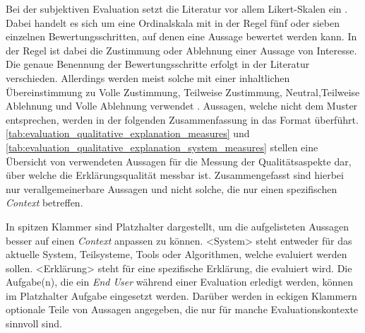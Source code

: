 \bigskip

Bei der subjektiven Evaluation setzt die Literatur vor allem Likert-Skalen ein \cite{sato_action-triggering_2019, sato_context_nodate, wang_is_2018}. Dabei handelt es sich um eine Ordinalskala mit in der Regel fünf oder sieben einzelnen Bewertungsschritten, auf denen eine Aussage bewertet werden kann. In der Regel ist dabei die Zustimmung oder Ablehnung einer Aussage von Interesse. Die genaue Benennung der Bewertungsschritte erfolgt in der Literatur verschieden. Allerdings werden meist solche mit einer inhaltlichen Übereinstimmung zu \glqq Volle Zustimmung\grqq{}, \glqq Teilweise Zustimmung\grqq{}, \glqq Neutral\grqq{},\glqq Teilweise Ablehnung\grqq{} und \glqq Volle Ablehnung\grqq{} verwendet \cite{hoffman_metrics_nodate, koo_understanding_2016, koo_why_2015, hernandez-bocanegra_effects_2020}. Aussagen, welche nicht dem Muster entsprechen, werden in der folgenden Zusammenfassung in das Format überführt. \autoref{tab:evaluation_qualitative_explanation_measures} und \autoref{tab:evaluation_qualitative_explanation_system_measures} stellen eine Übersicht von verwendeten Aussagen für die Messung der Qualitätsaspekte dar, über welche die Erklärungsqualität messbar ist. Zusammengefasst sind hierbei nur verallgemeinerbare Aussagen und nicht solche, die nur einen spezifischen \textit{Context} betreffen.

In spitzen Klammer sind Platzhalter dargestellt, um die aufgelisteten Aussagen besser auf einen \textit{Context} anpassen zu können. \glqq <System>\grqq{} steht entweder für das aktuelle System, Teilsysteme, Tools oder Algorithmen, welche evaluiert werden sollen. \glqq <Erklärung>\grqq{} steht für eine spezifische Erklärung, die evaluiert wird. Die Aufgabe(n), die ein \textit{End User} während einer Evaluation erledigt werden, können im Platzhalter \glqq Aufgabe\grqq{} eingesetzt werden. Darüber werden in eckigen Klammern optionale Teile von Aussagen angegeben, die nur für manche Evaluationskontexte sinnvoll sind.


